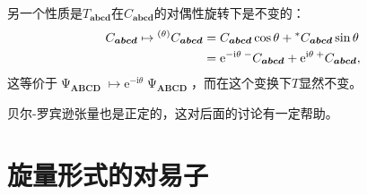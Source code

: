 另一个性质是$T_{\boldsymbol{abcd}}$在$C_{\boldsymbol{abcd}}$的对偶性旋转下是不变的：
\begin{equation*}
	\begin{aligned}
		C_{\boldsymbol{abcd}} \mapsto \prescript{( \theta )}{}{} C_{\boldsymbol{abcd}} & =C_{\boldsymbol{abcd}}\cos \theta +\prescript{*}{}{} C_{\boldsymbol{abcd}}\sin \theta \\
		& =\mathrm{e}^{-\mathrm{i} \theta }\prescript{-}{}{} C_{\boldsymbol{abcd}} +\mathrm{e}^{\mathrm{i} \theta }\prescript{+}{}{} C_{\boldsymbol{abcd}} ,
	\end{aligned}
\end{equation*}
这等价于$\upPsi _{\boldsymbol{ABCD}} \mapsto \mathrm{e}^{-\mathrm{i} \theta } \upPsi _{\boldsymbol{ABCD}}$，而在这个变换下$T$显然不变。

贝尔-罗宾逊张量也是正定的，这对后面的讨论有一定帮助。

\section{旋量形式的对易子}

